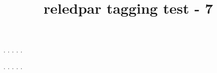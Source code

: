 \documentclass[a5paper,11pt]{article}
\title{reledpar tagging test - 7}
\begin{document}
\begin{pages}
    \begin{Leftside}
        \beginnumbering
            . \blindtext[21]
            \pend{}. \blindtext[10]
            \pend{}. \blindtext[6]
            \pend{}. \blindtext[6]
            \pend
            . \blindtext[6]
            \pend
        \endnumbering
    \end{Leftside}
    \begin{Rightside}
        \beginnumbering
            . \blindtext[22]\footnoteAmk
            \pend{}. \blindtext[12]
            \pend{}. \blindtext[12]
            \pend
            . \blindtext[12]
            \pend
            . \blindtext[12]
            \pend
        \endnumbering
    \end{Rightside}
\end{pages}
\Pages
\end{document}
